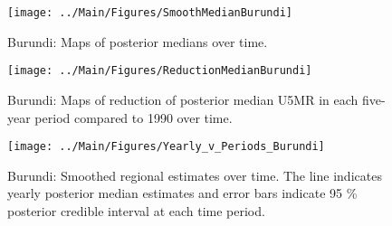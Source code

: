 \documentclass[12pt]{article}\usepackage[]{graphicx}\usepackage[]{color}
\newenvironment{knitrout}{}{} %
\begin{document}
\begin{knitrout}
\color{fgcolor}\begin{figure}[bht]

{\centering \texttt{[image: ../Main/Figures/SmoothMedianBurundi]} 

}

\caption[Burundi]{Burundi: Maps of posterior medians over time.}\label{fig:unnamed-chunk-34}
\end{figure}


\end{knitrout}
\begin{knitrout}
\color{fgcolor}\begin{figure}[bht]

{\centering \texttt{[image: ../Main/Figures/ReductionMedianBurundi]} 

}

\caption[Burundi]{Burundi: Maps of reduction of posterior median U5MR in each five-year period compared to 1990 over time.}\label{fig:unnamed-chunk-35}
\end{figure}


\end{knitrout}
\begin{knitrout}
\color{fgcolor}\begin{figure}[bht]

{\centering \texttt{[image: ../Main/Figures/Yearly\_v\_Periods\_Burundi]} 

}

\caption[Burundi]{Burundi: Smoothed regional estimates over time. The line indicates yearly posterior median estimates and error bars indicate 95 \% posterior credible interval at each time period.}\label{fig:unnamed-chunk-36}
\end{figure}


\end{knitrout}
\end{document}
